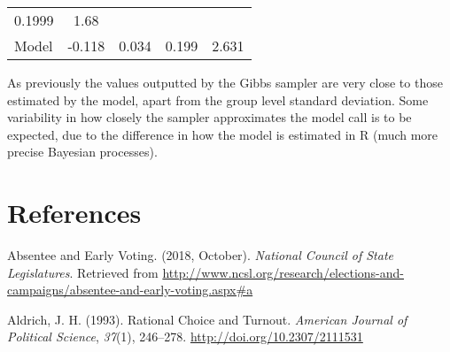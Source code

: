 \documentclass[12pt,twoside]{reedthesis}
\begin{document}
\begin{longtable}[]{@{}lcccc@{}}
\begin{minipage}[t]{0.12\columnwidth}
  0.1999\strut
  \end{minipage} & \begin{minipage}[t]{0.12\columnwidth}\centering\strut
  1.68\strut
  \end{minipage}\tabularnewline
  \begin{minipage}[t]{0.25\columnwidth}\raggedright\strut
  Model\strut
  \end{minipage} & \begin{minipage}[t]{0.16\columnwidth}\centering\strut
  -0.118\strut
  \end{minipage} & \begin{minipage}[t]{0.16\columnwidth}\centering\strut
  0.034\strut
  \end{minipage} & \begin{minipage}[t]{0.12\columnwidth}\centering\strut
  0.199\strut
  \end{minipage} & \begin{minipage}[t]{0.12\columnwidth}\centering\strut
  2.631\strut
  \end{minipage}\tabularnewline
  \bottomrule
  \end{longtable}
  
  As previously the values outputted by the Gibbs sampler are very close
  to those estimated by the model, apart from the group level standard
  deviation. Some variability in how closely the sampler approximates the
  model call is to be expected, due to the difference in how the model is
  estimated in R (much more precise Bayesian processes).
  
  \backmatter
  
  \chapter{References}\label{references}
  
  \noindent
  
  \setlength{\parindent}{-0.20in} \setlength{\leftskip}{0.20in}
  \setlength{\parskip}{8pt}
  
  \hypertarget{refs}{}
  \hypertarget{ref-national_council_of_state_legislatures_absentee_2018}{}
  Absentee and Early Voting. (2018, October). \emph{National Council of
  State Legislatures}. Retrieved from
  \url{http://www.ncsl.org/research/elections-and-campaigns/absentee-and-early-voting.aspx\#a}
  
  \hypertarget{ref-aldrich_rational_1993}{}
  Aldrich, J. H. (1993). Rational Choice and Turnout. \emph{American
  Journal of Political Science}, \emph{37}(1), 246--278.
  \url{http://doi.org/10.2307/2111531}
  
\end{document}
